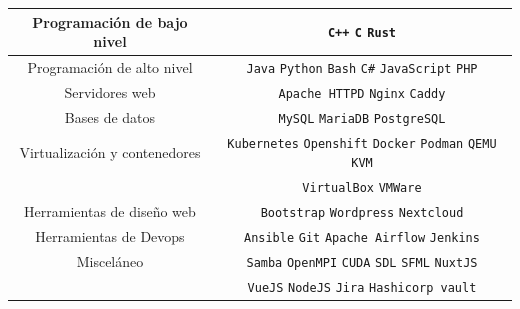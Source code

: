\documentclass[9pt]{developercv} %
\begin{document}
\begin{tabular}{|c|c|}\hline

  Programación de bajo nivel &
  \texttt{C++}  \slashsep
  \texttt{C}    \slashsep
  \texttt{Rust} \\ \hline

  Programación de alto nivel &
  \texttt{Java}       \slashsep
  \texttt{Python}     \slashsep
  \texttt{Bash}       \slashsep
  \texttt{C\#}        \slashsep
  \texttt{JavaScript} \slashsep
  \texttt{PHP}        \\ \hline

  Servidores web &
  \texttt{Apache HTTPD} \slashsep
  \texttt{Nginx}        \slashsep
  \texttt{Caddy}        \\ \hline

  Bases de datos &
  \texttt{MySQL}      \slashsep
  \texttt{MariaDB}    \slashsep
  \texttt{PostgreSQL} \\ \hline

  Virtualización y contenedores &
  \texttt{Kubernetes} \slashsep
  \texttt{Openshift}  \slashsep
  \texttt{Docker}     \slashsep
  \texttt{Podman}     \slashsep
  \texttt{QEMU}       \slashsep
  \texttt{KVM}        \\ &
  \texttt{VirtualBox} \slashsep
  \texttt{VMWare}     \\ \hline

  Herramientas de diseño web &
  \texttt{Bootstrap}      \slashsep
  \texttt{Wordpress}      \slashsep
  \texttt{Nextcloud}      \\ \hline

  Herramientas de Devops  &
  \texttt{Ansible}        \slashsep
  \texttt{Git}            \slashsep
  \texttt{Apache Airflow} \slashsep
  \texttt{Jenkins}        \\ \hline

  Misceláneo &
  \texttt{Samba}   \slashsep
  \texttt{OpenMPI} \slashsep
  \texttt{CUDA}    \slashsep
  \texttt{SDL}     \slashsep
  \texttt{SFML}    \slashsep
  \texttt{NuxtJS}  \\ &
  \texttt{VueJS}   \slashsep
  \texttt{NodeJS}  \slashsep
  \texttt{Jira}    \slashsep
  \texttt{Hashicorp vault}  \\ \hline

\end{tabular}
\end{document}
